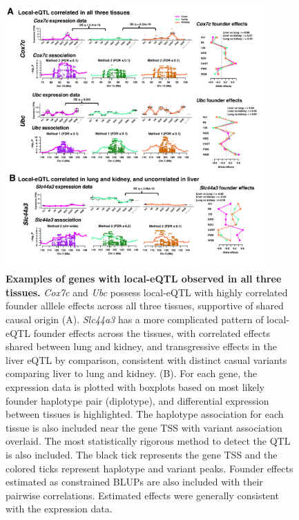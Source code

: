 \documentclass[9pt,twocolumn,twoside]{gsajnl}
\begin{document}
\begin{figure}[h!]
\renewcommand{\familydefault}{\sfdefault}\normalfont
\centering
\includegraphics[width=0.9\textwidth, trim={0in 0.5in 0in 0in}, clip]{figs/correlated_local_eqtl.pdf}
\caption{\textbf{Examples of genes with local-eQTL observed in all three tissues.} \textit{Cox7c} and \textit{Ubc} possess local-eQTL with highly correlated founder alllele effects across all three tissues, supportive of shared causal origin (A). \textit{Slc44a3} has a more complicated pattern of local-eQTL founder effects across the tissues, with correlated effects shared between lung and kidney, and transgressive effects in the liver eQTL by comparison, consistent with distinct casual variants comparing liver to lung and kidney. (B). For each gene, the expression data is plotted with boxplots based on most likely founder haplotype pair (diplotype), and differential expression between tissues is highlighted. The haplotype association for each tissue is also included near the gene TSS with variant association overlaid. The most statistically rigorous method to detect the QTL is also included. The black tick represents the gene TSS and the colored ticks represent haplotype and variant peaks. Founder effects estimated as constrained BLUPs are also included with their pairwise correlations. Estimated effects were generally consistent with the expression data.\label{fig:correlated_local_eqtl}}
\end{figure}
\end{document}
